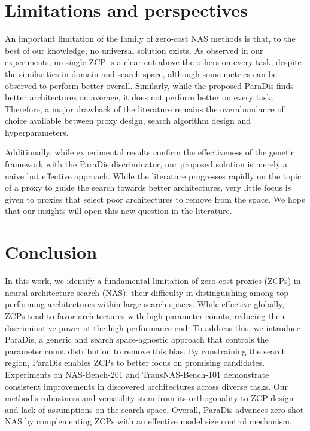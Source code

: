 \documentclass[10pt]{article} %
\begin{document}
\section{Limitations and perspectives}
\label{limitations}

An important limitation of the family of zero-cost NAS methods is that, to the best of our knowledge, no universal solution exists. As observed in our experiments, no single ZCP is a clear cut above the others on every task, despite the similarities in domain and search space, although some metrics can be observed to perform better overall. Similarly, while the proposed ParaDis finds better architectures on average, it does not perform better on every task. Therefore, a major drawback of the literature remains the overabundance of choice available between proxy design, search algorithm design and hyperparameters. 

Additionally, while experimental results confirm the effectiveness of the genetic framework with the ParaDis discriminator, our proposed solution is merely a naive but effective approach. While the literature progresses rapidly on the topic of a proxy to guide the search towards better architectures, very little focus is given to proxies that select poor architectures to remove from the space. We hope that our insights will open this new question in the literature.

\section{Conclusion}
\label{conclusion}

In this work, we identify a fundamental limitation of zero-cost proxies (ZCPs) in neural architecture search (NAS): their difficulty in distinguishing among top-performing architectures within large search spaces. While effective globally, ZCPs tend to favor architectures with high parameter counts, reducing their discriminative power at the high-performance end. To address this, we introduce ParaDis, a generic and search space-agnostic approach that controls the parameter count distribution to remove this bias. By constraining the search region, ParaDis enables ZCPs to better focus on promising candidates. Experiments on NAS-Bench-201 and TransNAS-Bench-101 demonstrate consistent improvements in discovered architectures across diverse tasks. Our method’s robustness and versatility stem from its orthogonality to ZCP design and lack of assumptions on the search space. Overall, ParaDis advances zero-shot NAS by complementing ZCPs with an effective model size control mechanism.
\end{document}
